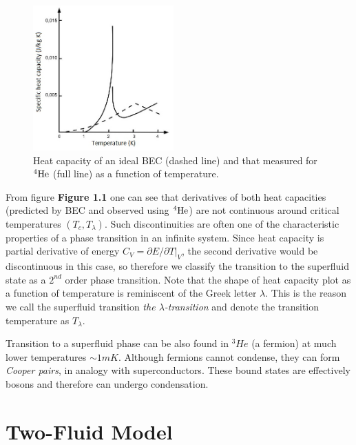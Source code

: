 \begin{figure}
\vspace{-0.7cm}
\centering
\includegraphics[width=0.48\textwidth]{graphics/capacity_bec}
\caption{Heat capacity of an ideal BEC (dashed line) and that measured for ${}^4\mathrm{He}$ (full line) as a function of temperature.}
\vspace{-0.5cm}
\end{figure}
From figure {\sffamily\textbf{Figure 1.1}} one can see that derivatives of both heat capacities (predicted by BEC and observed using $ {}^4\mathrm{He} $) are not continuous around critical temperatures $(T_c, T_{\lambda})$. Such discontinuities are often one of the characteristic properties of a phase transition in an infinite system. Since heat capacity is partial derivative of energy $ C_V = \partial E /\partial T \big\vert_V $, the second derivative would be discontinuous in this case, so therefore we classify the transition to the superfluid state as a $2^{\unit{nd}}$ order phase transition. Note that the shape of heat capacity plot as a function of temperature is reminiscent of the Greek letter $ \lambda $. This is the reason we call the superfluid transition   \textit{the $ \lambda$-transition} and denote the transition temperature as $ T_{\lambda}$.

Transition to a superfluid phase can be also found in ${}^3\!\unit{He}$ (a fermion) at much lower temperatures $ \sim 1 \unit{mK} $. Although fermions cannot condense, they can form \textit{Cooper pairs}, in analogy with superconductors. These bound states are effectively bosons and therefore can undergo condensation.






\section{Two-Fluid Model}

